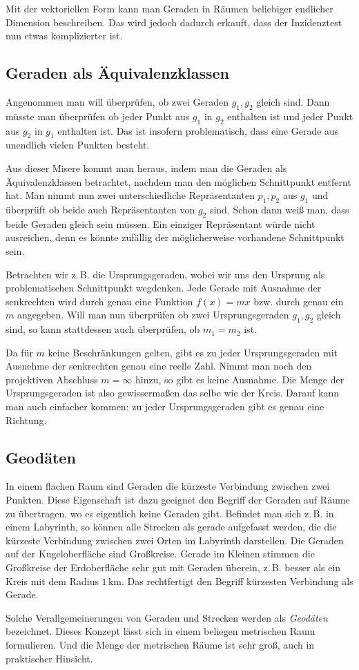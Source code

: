 \documentclass[a4paper,11pt,fleqn,twocolumn,twoside]{article}
\begin{document}
Mit der vektoriellen Form kann man Geraden in Räumen beliebiger
endlicher Dimension beschreiben. Das wird jedoch dadurch erkauft,
dass der Inzidenztest nun etwas komplizierter ist.

\subsection{Geraden als Äquivalenzklassen}

Angenommen man will überprüfen, ob zwei Geraden $g_1,g_2$ gleich sind.
Dann müsste man überprüfen ob jeder Punkt aus $g_1$ in $g_2$
enthalten ist und jeder Punkt aus $g_2$ in $g_1$ enthalten ist.
Das ist insofern problematisch, dass eine Gerade aus unendlich vielen
Punkten besteht.

Aus dieser Misere kommt man heraus, indem man die Geraden als
Äquivalenzklassen betrachtet, nachdem man den möglichen Schnittpunkt
entfernt hat. Man nimmt nun zwei unterschiedliche Repräsentanten
$p_1,p_2$ aus $g_1$ und überprüft ob beide auch Repräsentanten
von $g_2$ sind. Schon dann weiß man, dass beide Geraden gleich
sein müssen. Ein einziger Repräsentant würde nicht ausreichen, denn
es könnte zufällig der möglicherweise vorhandene Schnittpunkt sein.

Betrachten wir z.\,B. die Ursprungsgeraden, wobei wir uns den
Ursprung als problematischen Schnittpunkt wegdenken. Jede Gerade
mit Ausnahme der senkrechten wird durch genau eine Funktion
$f(x)=mx$ bzw. durch genau ein $m$ angegeben.
Will man nun überprüfen ob zwei Ursprungsgeraden $g_1,g_2$ gleich
sind, so kann stattdessen auch überprüfen, ob $m_1=m_2$ ist.

Da für $m$ keine Beschränkungen gelten, gibt es zu jeder
Ursprungsgeraden mit Ausnehme der senkrechten genau eine reelle Zahl.
Nimmt man noch den projektiven Abschluss $m=\infty$ hinzu, so
gibt es keine Ausnahme. Die Menge der Ursprungsgeraden ist also
gewissermaßen das selbe wie der Kreis. Darauf kann man auch einfacher
kommen: zu jeder Ursprungsgeraden gibt es genau eine Richtung.


\subsection{Geodäten}

In einem flachen Raum sind Geraden die kürzeste Verbindung zwischen
zwei Punkten. Diese Eigenschaft ist dazu geeignet den Begriff der
Geraden auf Räume zu übertragen, wo es eigentlich keine Geraden
gibt. Befindet man sich z.\,B. in einem Labyrinth, so können alle
Strecken als gerade aufgefasst werden, die die kürzeste Verbindung
zwischen zwei Orten im Labyrinth darstellen. Die Geraden auf der
Kugeloberfläche sind Großkreise. Gerade im Kleinen stimmen die
Großkreise der Erdoberfläche sehr gut mit Geraden überein,
z.\,B. besser als ein Kreis mit dem Radius $1\,\mathrm{km}$.
Das rechtfertigt den Begriff kürzesten Verbindung als Gerade.

Solche Verallgemeinerungen von Geraden und Strecken werden als
\textit{Geodäten} bezeichnet. Dieses Konzept lässt sich in einem
beliegen metrischen Raum formulieren. Und die Menge der metrischen
Räume ist sehr groß, auch in praktischer Hinsicht.
\end{document}
